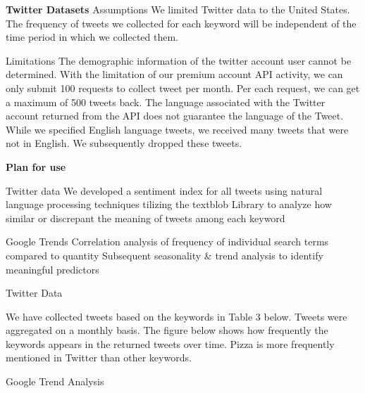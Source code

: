 \documentclass[12pt,oneside]{chicagocapstone}
\begin{document}
\textbf{Twitter Datasets} Assumptions We limited Twitter data to the
United States. The frequency of tweets we collected for each keyword
will be independent of the time period in which we collected them.

Limitations The demographic information of the twitter account user
cannot be determined. With the limitation of our premium account API
activity, we can only submit 100 requests to collect tweet per month.
Per each request, we can get a maximum of 500 tweets back. The language
associated with the Twitter account returned from the API does not
guarantee the language of the Tweet. While we specified English language
tweets, we received many tweets that were not in English. We
subsequently dropped these tweets.

\textbf{Plan for use}

Twitter data We developed a sentiment index for all tweets using natural
language processing techniques tilizing the textblob Library to analyze
how similar or discrepant the meaning of tweets among each keyword

Google Trends Correlation analysis of frequency of individual search
terms compared to quantity Subsequent seasonality \& trend analysis to
identify meaningful predictors

Twitter Data

We have collected tweets based on the keywords in Table 3 below. Tweets
were aggregated on a monthly basis. The figure below shows how
frequently the keywords appears in the returned tweets over time. Pizza
is more frequently mentioned in Twitter than other keywords.

Google Trend Analysis
\end{document}
